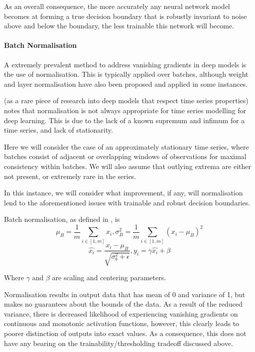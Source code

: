 \documentclass[9pt,conference]{IEEEtran}
\begin{document}
As an overall consequence, the more accurately any neural network model becomes at forming a true decision boundary that is robustly invariant to noise above and below the boundary, the less trainable this network will become.

\paragraph{Batch Normalisation}
A extremely prevalent method to address vanishing gradients in deep models is the use of normalisation. This is typically applied over batches, although weight and layer normalisation have also been proposed and applied in some instances.

\cite{invariantsWithDNN} (as a rare piece of research into deep models that respect time series properties) notes that normalisation is not always appropriate for time series modelling for deep learning. This is due to the lack of a known supremum and infimum for a time series, and lack of stationarity. 

Here we will consider the case of an approximately stationary time series, where batches consist of adjacent or overlapping windows of observations for maximal consistency within batches. We will also assume that outlying extrema are either not present, or extremely rare in the series.

In this instance, we will consider what improvement, if any, will normalisation lend to the aforementioned issues with trainable and robust decision boundaries.

Batch normalisation, as defined in \cite{invariantsWithDNN}, is
\begin{equation*}
    \mu_B = \frac{1}{m}\sum_{i \in \left[1,m\right]}x_i, \sigma_B^2 = \frac{1}{m}\sum_{i \in \left[1,m\right]}\left(x_i-\mu_B\right)^2
\end{equation*}
\begin{equation*}
    \hat{x_i} = \frac{x_i-\mu_B}{\sqrt{\sigma_b^2+\epsilon}}, y_i = \gamma\hat{x_i}+\beta
\end{equation*}

Where $\gamma$ and $\beta$ are scaling and centering parameters.

Normalisation results in output data that has mean of 0 and variance of 1, but makes no guarantees about the bounds of the data. As a result of the reduced variance, there is decreased likelihood of experiencing vanishing gradients on continuous and monotonic activation functions, however, this clearly leads to poorer distinction of outputs into exact values. As a consequence, this does not have any bearing on the trainability/thresholding tradeoff discussed above.
\end{document}
